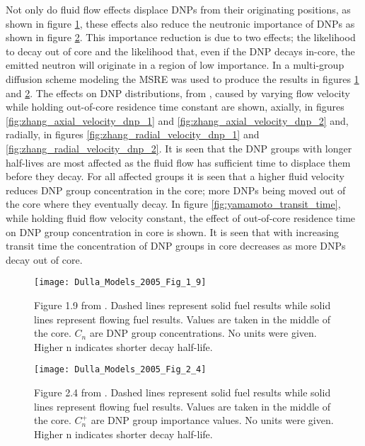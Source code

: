 \documentclass[review]{elsarticle}
\begin{document}
\par Not only do fluid flow effects displace DNPs from their originating positions,
as shown in figure \ref{fig:dulla_msre_dnp_displacement}, these effects also
reduce the neutronic importance of DNPs as shown in figure
\ref{fig:dulla_msre_dnp_importance}. This importance reduction is due to two
effects; the likelihood to decay out of core and the likelihood that, even if the
DNP decays in-core, the emitted neutron will originate in a region of low
importance. In \cite{dulla_models_2005} a multi-group
diffusion scheme modeling the MSRE was used to produce the results in figures
\ref{fig:dulla_msre_dnp_displacement} and \ref{fig:dulla_msre_dnp_importance}.
The effects on DNP distributions, from \cite{zhang_development_2009-1}, caused
by varying flow velocity while holding out-of-core residence time constant are
shown, axially, in figures \ref{fig:zhang_axial_velocity_dnp_1} and 
\ref{fig:zhang_axial_velocity_dnp_2} and, radially, in figures
\ref{fig:zhang_radial_velocity_dnp_1} and \ref{fig:zhang_radial_velocity_dnp_2}.
It is seen that the DNP groups with longer half-lives are most affected as the
fluid flow has sufficient time to displace them before they decay. For all
affected groups it is seen that a higher fluid velocity reduces DNP group
concentration in the core; more DNPs being moved out of the core where they
eventually decay. In figure \ref{fig:yamamoto_transit_time}, while holding fluid flow velocity constant, the effect of
out-of-core residence time on DNP group concentration
in core is shown. It is seen that with increasing transit time the concentration
of DNP groups in core decreases as more DNPs decay out of core.   

\begin{figure}[h]
   \centering
   \texttt{[image: Dulla\_Models\_2005\_Fig\_1\_9]}
   \caption{Figure 1.9 from \cite{dulla_models_2005}. Dashed lines represent
    solid fuel results while solid lines represent flowing fuel results. Values
    are taken in the middle of the core. $C_{n}$ are DNP group concentrations. No
    units were given. Higher n indicates shorter decay half-life.}
   \label{fig:dulla_msre_dnp_displacement}
\end{figure}

\begin{figure}[h]
   \centering
   \texttt{[image: Dulla\_Models\_2005\_Fig\_2\_4]}
   \caption{Figure 2.4 from \cite{dulla_models_2005}. Dashed lines represent
    solid fuel results while solid lines represent flowing fuel results. Values
    are taken in the middle of the core. $C_{n}^{+}$ are DNP group importance values. 
    No units were given. Higher n indicates shorter decay half-life.}
   \label{fig:dulla_msre_dnp_importance}
\end{figure}
\end{document}
